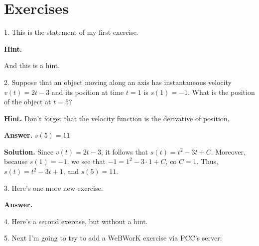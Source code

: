 \documentclass[10pt,]{book}
\theoremstyle{plain}
\theoremstyle{definition}
\theoremstyle{definition}
\theoremstyle{definition}
\begin{document}
\section[Exercises]{Exercises}\label{exercises-sets}
\begin{exerciselist}
\item[1.]\hypertarget{exercises-sets-trial}{}
			This is the statement of my first exercise.
		\par\smallskip
\par\smallskip
\noindent\textbf{Hint.}\hypertarget{hint-4}{}\quad

			And this is a hint.
		\item[2.]\hypertarget{exercises-sets-with-solution}{}
			Suppose that an object moving along an axis has instantaneous velocity \(v(t) = 2t-3\) and its position at time \(t=1\) is \(s(1) = -1\).  What is the position of the object at \(t = 5\)?
		\par\smallskip
\par\smallskip
\noindent\textbf{Hint.}\hypertarget{hint-5}{}\quad
 Don't forget that the velocity function is the derivative of position. \par\smallskip
\noindent\textbf{Answer.}\hypertarget{answer-3}{}\quad
\(s(5) = 11\)\par\smallskip
\noindent\textbf{Solution.}\hypertarget{solution-3}{}\quad
Since \(v(t) = 2t-3\), it follows that \(s(t) = t^2 - 3t + C\).  Moreover, because \(s(1)=-1\), we see that \(-1 = 1^2 - 3 \cdot 1 + C\), co \(C = 1\).  Thus, \(s(t) = t^2 - 3t + 1\), and \(s(5) = 11\). \item[3.]\hypertarget{exercises-sets-with-answer}{}
			Here's one more new exercise.
		\par\smallskip
\par\smallskip
\noindent\textbf{Answer.}\hypertarget{answer-4}{}\item[4.]\hypertarget{exercises-sets-test}{}
			Here's a second exercise, but without a hint.
		\par\smallskip
\item[5.]\hypertarget{exercises-sets-with-webwork}{}\typeout{************************************************}
\typeout{************************************************}
 Next I'm going to try to add a WeBWorK exercise via PCC's server: %
\mbox{}\\ %
\begin{mdframed}
{}\par\vspace*{2ex}%

\end{mdframed}
\end{exerciselist}
\end{document}

